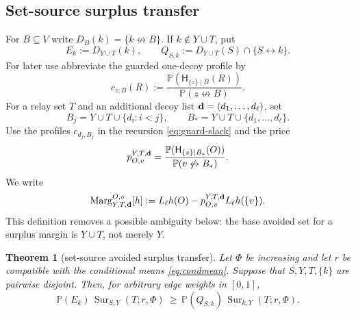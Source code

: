 \documentclass[11pt]{article}
\newtheorem{theorem}{Theorem}[section]
\theoremstyle{definition}
\theoremstyle{remark}
\newcommand{\PP}{\mathbb P}
\newcommand{\Sur}{\operatorname{Sur}}
\newcommand{\con}{\leftrightarrow}
\newcommand{\ncon}{\not\leftrightarrow}
\begin{document}
\subsection{Set-source surplus transfer}

For $B\subseteq V$ write $D_B(k)=\{k\ncon B\}$.  If $k\notin Y\cup T$,
put
\begin{equation}\label{eq:EkJk}
 E_k:=D_{Y\cup T}(k),\qquad
 Q_{S,k}:=D_{Y\cup T}(S)\cap\{S\con k\}.
\end{equation}
For later use abbreviate the guarded one-decoy profile by
\begin{equation}\label{eq:c-general}
 c_{z,B}(R):=
 \frac{\PP(\mathsf H_{\{z\}\mid B}(R))}{\PP(z\ncon B)}.
\end{equation}
For a relay set $T$ and an additional decoy list
${\bf d}=(d_1,\ldots,d_\ell)$, set
\[
 B_j=Y\cup T\cup\{d_i:i<j\},\qquad
 B_*=Y\cup T\cup\{d_1,\ldots,d_\ell\}.
\]
Use the profiles $c_{d_j,B_j}$ in the recursion \eqref{eq:guard-slack}
and the price
\[
 p_{O,v}^{Y,T,{\bf d}}
 =\frac{\PP(\mathsf H_{\{v\}\mid B_*}(O))}
        {\PP(v\ncon B_*)}.
\]
We write
\begin{equation}\label{eq:surplus-general-margin}
 \operatorname{Marg}_{Y,T,{\bf d}}^{O,v}[h]
 :=L_\ell h(O)-p_{O,v}^{Y,T,{\bf d}}L_\ell h(\{v\}).
\end{equation}
This definition removes a possible ambiguity below: the base avoided set
for a surplus margin is $Y\cup T$, not merely $Y$.

\begin{theorem}[set-source avoided surplus transfer]\label{thm:setS5}
Let $\Phi$ be increasing and let $r$ be compatible with the conditional
means \eqref{eq:condmean}.  Suppose that $S,Y,T,\{k\}$ are pairwise
disjoint.  Then, for arbitrary edge weights in $[0,1]$,
\begin{equation}\label{eq:setS5}
 \PP(E_k)\,\Sur_{S,Y}(T;r,\Phi)
 \ \geq\
 \PP(Q_{S,k})\,\Sur_{k,Y}(T;r,\Phi).
\end{equation}
\end{theorem}
\end{document}
